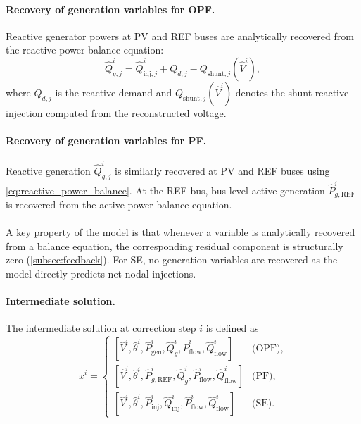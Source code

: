 \paragraph{Recovery of generation variables for OPF.}

Reactive generator powers at PV and REF buses are analytically recovered from the reactive power balance equation:
\begin{equation}
\label{eq:reactive_power_balance}
\hat{Q}_{g,j}^i
=
\hat{Q}_{\mathrm{inj},j}^i
+
Q_{d,j}
-
Q_{\mathrm{shunt},j}(\hat{V}^i),
\end{equation}
where
$Q_{d,j}$ is the reactive demand and
$Q_{\mathrm{shunt},j}(\hat{V}^i)$
denotes the shunt reactive injection computed from the reconstructed voltage.

\paragraph{Recovery of generation variables for PF.}

Reactive generation
$\hat{Q}_{g,j}^i$
is similarly recovered at PV and REF buses using \cref{eq:reactive_power_balance}.
At the REF bus, bus-level active generation
$\hat{P}_{g,\mathrm{REF}}^i$
is recovered from the active power balance equation.
\\\\
A key property of the model is that whenever a variable is analytically recovered from a balance equation,
the corresponding residual component is structurally zero
(\cref{subsec:feedback}). For SE, no generation variables are recovered as the model directly predicts net nodal injections.


\paragraph{Intermediate solution.}

The intermediate solution at correction step $i$ is defined as
\begin{equation}
x^i =
\begin{cases}
[
\hat{V}^i,
\hat{\theta}^i,
\hat{P}_{\mathrm{gen}}^i,
\hat{Q}_{g}^i,
\hat{P}_{\mathrm{flow}}^i,
\hat{Q}_{\mathrm{flow}}^i
]
& \text{(OPF)},
\\[6pt]
[
\hat{V}^i,
\hat{\theta}^i,
\hat{P}_{g,\mathrm{REF}}^i,
\hat{Q}_{g}^i,
\hat{P}_{\mathrm{flow}}^i,
\hat{Q}_{\mathrm{flow}}^i
]
& \text{(PF)},
\\[6pt]
[
\hat{V}^i,
\hat{\theta}^i,
\hat{P}_{\mathrm{inj}}^i,
\hat{Q}_{\mathrm{inj}}^i,
\hat{P}_{\mathrm{flow}}^i,
\hat{Q}_{\mathrm{flow}}^i
]
& \text{(SE)}.
\end{cases}
\end{equation}

